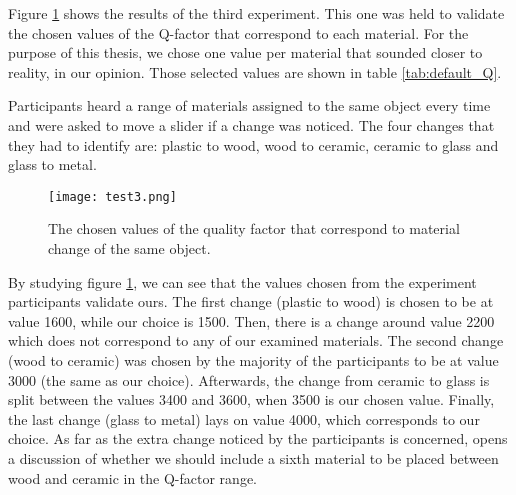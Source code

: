 Figure \ref{fig:test3} shows the results of the third experiment. This one was held to validate the chosen values of the Q-factor that correspond to each material. For the purpose of this thesis, we chose one value per material that sounded closer to reality, in our opinion. Those selected values are shown in table \ref{tab:default_Q}.  

Participants heard a range of materials assigned to the same object every time and were asked to move a slider if a change was noticed. The four changes that they had to identify are: plastic to wood, wood to ceramic, ceramic to glass and glass to metal.

\begin{figure}[H]
  \centering
    \texttt{[image: test3.png]}
      \caption{The chosen values of the quality factor that correspond to material change of the same object.}\label{fig:test3}
\end{figure}

By studying figure \ref{fig:test3}, we can see that the values chosen from the experiment participants validate ours. The first change (plastic to wood) is chosen to be at value 1600, while our choice is 1500. Then, there is a change around value 2200 which does not correspond to any of our examined materials. The second change (wood to ceramic) was chosen by the majority of the participants to be at value 3000 (the same as our choice). Afterwards, the change from ceramic to glass is split between the values 3400 and 3600, when 3500 is our chosen value. Finally, the last change (glass to metal) lays on value 4000, which corresponds to our choice. As far as the extra change noticed by the participants is concerned, opens a discussion of whether we should include a sixth material to be placed between wood and ceramic in the Q-factor range.


